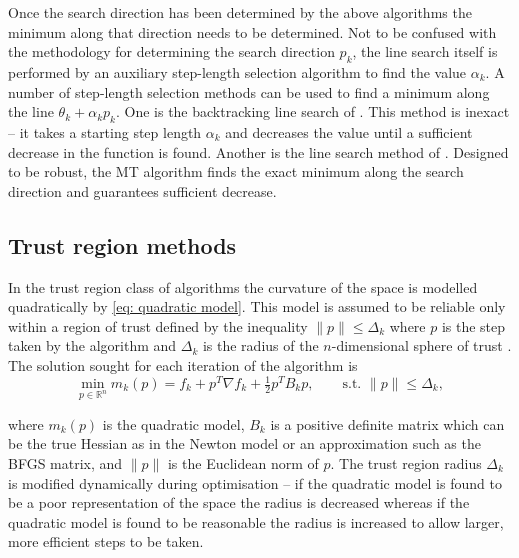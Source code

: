 Once the search direction has been determined by the above algorithms the minimum along that direction needs to be determined.
Not to be confused with the methodology for determining the search direction $p_k$, the line search itself is performed by an auxiliary step-length selection algorithm to find the value $\alpha_k$.
A number of step-length selection methods can be used to find a minimum along the line $\theta_k + \alpha_k p_k$.
One is the backtracking line search of \citet{NocedalWright99}.
This method is inexact -- it takes a starting step length $\alpha_k$ and decreases the value until a sufficient decrease in the function is found.
Another is the line search method of \citet{MoreThuente94}.
Designed to be robust, the MT algorithm finds the exact minimum along the search direction and guarantees sufficient decrease.




\subsection{Trust region methods}

In the trust region class of algorithms the curvature of the space is modelled quadratically by \eqref{eq: quadratic model}.
This model is assumed to be reliable only within a region of trust defined by the inequality $\lVert p \rVert \leqslant \Delta_k$ where $p$ is the step taken by the algorithm and $\Delta_k$ is the radius of the $n$-dimensional sphere of trust \citep{NocedalWright99}.
The solution sought for each iteration of the algorithm is
\begin{equation} \label{eq: trust region}
 \min_{p \in \mathbb{R}^n} m_k(p) = f_k  +  p^{T} \nabla f_k  +  \tfrac{1}{2} p^{T} B_k p,  \qquad \textrm{s.t. } \lVert p \rVert \leqslant \Delta_k,
\end{equation}

\noindent where $m_k(p)$ is the quadratic model, $B_k$ is a positive definite matrix which can be the true Hessian as in the Newton model or an approximation such as the BFGS matrix, and $\lVert p \rVert$ is the Euclidean norm of $p$.
The trust region radius $\Delta_k$ is modified dynamically during optimisation -- if the quadratic model is found to be a poor representation of the space the radius is decreased whereas if the quadratic model is found to be reasonable the radius is increased to allow larger, more efficient steps to be taken.


